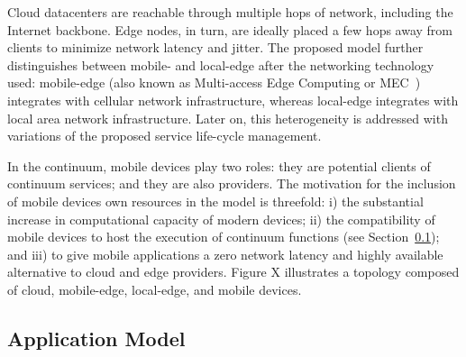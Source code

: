Cloud datacenters are reachable through multiple hops of network, including the Internet backbone. Edge nodes, in turn, are ideally placed a few hops away from clients to minimize network latency and jitter. The proposed model further distinguishes between mobile- and local-edge after the networking technology used: mobile-edge (also known as Multi-access Edge Computing or MEC~\cite{}) integrates with cellular network infrastructure, whereas local-edge integrates with local area network infrastructure. Later on, this heterogeneity is addressed with variations of the proposed service life-cycle management.

In the continuum, mobile devices play two roles: they are potential clients of continuum services; and they are also providers. The motivation for the inclusion of mobile devices own resources in the model is threefold: i) the substantial increase in computational capacity of modern devices; ii) the compatibility of mobile devices to host the execution of continuum functions (see Section~\ref{sec:application_model}); and iii) to give mobile applications a zero network latency and highly available alternative to cloud and edge providers. Figure X illustrates a topology composed of cloud, mobile-edge, local-edge, and mobile devices. 





\subsection{Application Model}\label{sec:application_model}

